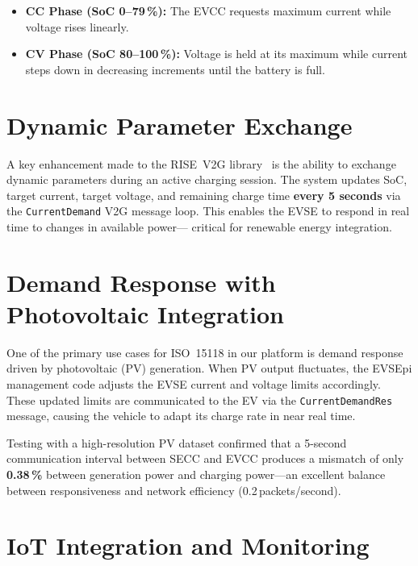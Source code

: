 \documentclass[12pt,a4paper]{report}
\begin{document}
\begin{itemize}
  \item \textbf{CC Phase (SoC 0--79\,\%):} The EVCC requests maximum current while voltage rises
        linearly.

  \item \textbf{CV Phase (SoC 80--100\,\%):} Voltage is held at its maximum while current steps
        down in decreasing increments until the battery is full.
\end{itemize}

\section{Dynamic Parameter Exchange}

A key enhancement made to the RISE~V2G library~\autocite{rise_v2g} is the ability to exchange dynamic
parameters during an active charging session. The system updates SoC, target current, target
voltage, and remaining charge time \textbf{every 5 seconds} via the \texttt{CurrentDemand} V2G
message loop. This enables the EVSE to respond in real time to changes in available power---
critical for renewable energy integration.

\section{Demand Response with Photovoltaic Integration}

One of the primary use cases for ISO~15118 in our platform is demand response driven by
photovoltaic (PV) generation. When PV output fluctuates, the EVSEpi management code adjusts the
EVSE current and voltage limits accordingly. These updated limits are communicated to the EV via
the \texttt{CurrentDemandRes} message, causing the vehicle to adapt its charge rate in near real
time.

Testing with a high-resolution PV dataset confirmed that a 5-second communication interval
between SECC and EVCC produces a mismatch of only \textbf{0.38\,\%} between generation power and
charging power---an excellent balance between responsiveness and network efficiency
(0.2\,packets/second).

\section{IoT Integration and Monitoring}
\end{document}
